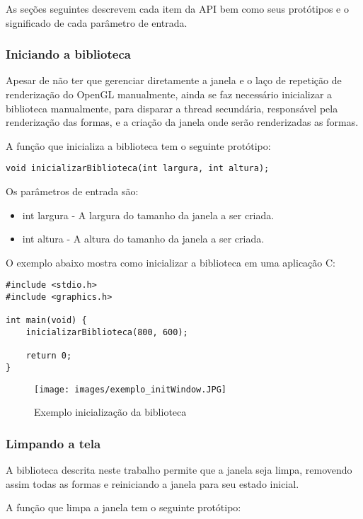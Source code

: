 \documentclass[12pt, %
openright,
oneside, %
a4paper,    %
brazil]{facom-ufu-abntex2}
\begin{document}
As seções seguintes descrevem cada item da API bem como seus protótipos e o significado de cada parâmetro de entrada.

\subsubsection{Iniciando a biblioteca}
Apesar de não ter que gerenciar diretamente a janela e o laço de repetição de renderização do OpenGL manualmente, ainda se faz necessário inicializar a biblioteca manualmente, para disparar a thread secundária, responsável pela renderização das formas, e a criação da janela onde serão renderizadas as formas.

A função que inicializa a biblioteca tem o seguinte protótipo:

\begin{lstlisting}
void inicializarBiblioteca(int largura, int altura);
\end{lstlisting}

Os parâmetros de entrada são:

\begin{itemize}
    \item int largura - A largura do tamanho da janela a ser criada.
    \item int altura - A altura do tamanho da janela a ser criada.
\end{itemize}

O exemplo abaixo mostra como inicializar a biblioteca em uma aplicação C:
\begin{lstlisting}
#include <stdio.h>
#include <graphics.h>

int main(void) {
    inicializarBiblioteca(800, 600);
    
    return 0;
}
\end{lstlisting}

\begin{figure}[!htbp]
  \centering
  \texttt{[image: images/exemplo\_initWindow.JPG]}
  \caption{Exemplo inicialização da biblioteca}
  \label{fig:exemplo_initWindow}
\end{figure}

\subsubsection{Limpando a tela}
A biblioteca descrita neste trabalho permite que a janela seja limpa, removendo assim todas as formas e reiniciando a janela para seu estado inicial.

A função que limpa a janela tem o seguinte protótipo:
\end{document}
